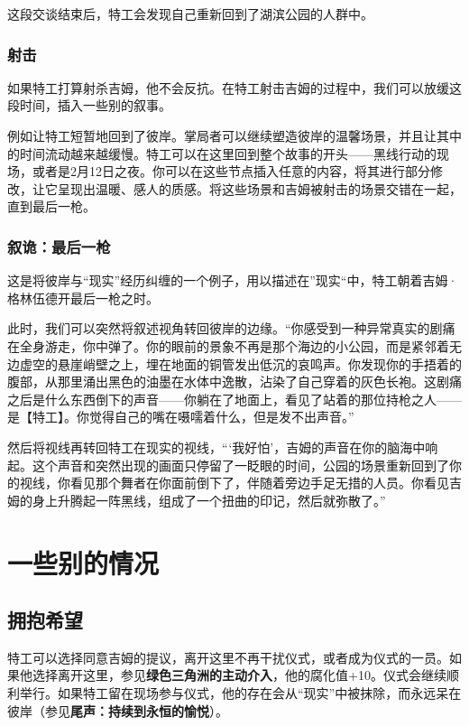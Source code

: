 这段交谈结束后，特工会发现自己重新回到了湖滨公园的人群中。

\subsubsection{射击}

如果特工打算射杀吉姆，他不会反抗。在特工射击吉姆的过程中，我们可以放缓这段时间，插入一些别的叙事。

例如让特工短暂地回到了彼岸。掌局者可以继续塑造彼岸的温馨场景，并且让其中的时间流动越来越缓慢。特工可以在这里回到整个故事的开头——黑线行动的现场，或者是2月12日之夜。你可以在这些节点插入任意的内容，将其进行部分修改，让它呈现出温暖、感人的质感。将这些场景和吉姆被射击的场景交错在一起，直到最后一枪。

\subsubsection{叙诡：最后一枪}

这是将彼岸与“现实”经历纠缠的一个例子，用以描述在”现实“中，特工朝着吉姆·格林伍德开最后一枪之时。

此时，我们可以突然将叙述视角转回彼岸的边缘。“你感受到一种异常真实的剧痛在全身游走，你中弹了。你的眼前的景象不再是那个海边的小公园，而是紧邻着无边虚空的悬崖峭壁之上，埋在地面的铜管发出低沉的哀鸣声。你发现你的手捂着的腹部，从那里涌出黑色的油墨在水体中逸散，沾染了自己穿着的灰色长袍。这剧痛之后是什么东西倒下的声音——你躺在了地面上，看见了站着的那位持枪之人——是【特工】。你觉得自己的嘴在嗫嚅着什么，但是发不出声音。”

然后将视线再转回特工在现实的视线，“‘我好怕’，吉姆的声音在你的脑海中响起。这个声音和突然出现的画面只停留了一眨眼的时间，公园的场景重新回到了你的视线，你看见那个舞者在你面前倒下了，伴随着旁边手足无措的人员。你看见吉姆的身上升腾起一阵黑线，组成了一个扭曲的印记，然后就弥散了。”

\section{一些别的情况}

\subsection{拥抱希望}

特工可以选择同意吉姆的提议，离开这里不再干扰仪式，或者成为仪式的一员。如果他选择离开这里，参见\textbf{绿色三角洲的主动介入}，他的腐化值+10。仪式会继续顺利举行。如果特工留在现场参与仪式，他的存在会从“现实”中被抹除，而永远呆在彼岸（参见\textbf{尾声：持续到永恒的愉悦}）。

